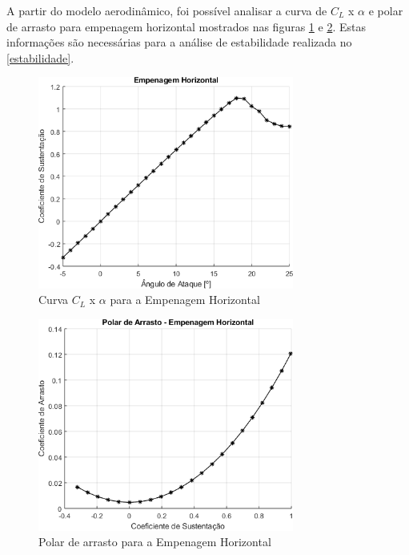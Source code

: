 A partir do modelo aerodinâmico, foi possível analisar a curva de $C_L$ x $\alpha$ e polar de arrasto para empenagem horizontal mostrados nas figuras \ref{fig:eh_cl_alfa} e \ref{fig:eh_cl_cd}. Estas informações são necessárias para a análise de estabilidade realizada no \autoref{estabilidade}.

\begin{figure}[H]
\centering
\includegraphics[width=0.75\textwidth]{images/parte3/eh_cl_alfa.png}
\caption[Curva $C_L$ x $\alpha$ para a Empenagem Horizontal]{Curva $C_L$ x $\alpha$ para a Empenagem Horizontal}
\label{fig:eh_cl_alfa}
\end{figure}

\begin{figure}[H]
\centering
\includegraphics[width=0.75\textwidth]{images/parte3/eh_cl_cd.png}
\caption[Polar de arrasto para a Empenagem Horizontal]{Polar de arrasto para a Empenagem Horizontal}
\label{fig:eh_cl_cd}
\end{figure}

